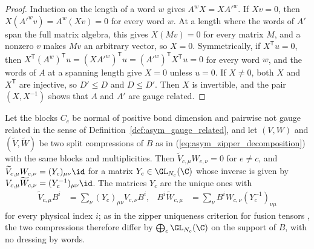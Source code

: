 \begin{proof}
    \leanok
    Induction on the length of a word $w$ gives $A^wX=XA'^w$. If $Xv=0$, then
    $X(A'^wv)=A^w(Xv)=0$ for every word $w$. At a length where the words of
    $A'$ span the full matrix algebra, this gives $X(Mv)=0$ for every matrix
    $M$, and a nonzero $v$ makes $Mv$ an arbitrary vector, so $X=0$.
    Symmetrically, if $X^{\mathsf T}u=0$, then
    $X^{\mathsf T}(A^w)^{\mathsf T}u=(XA'^w)^{\mathsf T}u
        =(A'^w)^{\mathsf T}X^{\mathsf T}u=0$ for every word $w$, and the words
    of $A$ at a spanning length give $X=0$ unless $u=0$. If $X\neq0$, both
    $X$ and $X^{\mathsf T}$ are injective, so $D'\leq D$ and $D\leq D'$. Then $X$ is
    invertible, and the pair $(X,X^{-1})$ shows that $A$ and $A'$ are
    gauge related.
\end{proof}

\begin{lemma}
    \label{thm:asym_zipper_uniqueness}
    \leanok
    Let the blocks $C_c$ be normal of positive bond dimension and pairwise
    not gauge related in the sense of Definition~\ref{def:asym_gauge_related},
    and let $(V,W)$ and
    $(\widetilde V,\widetilde W)$ be two split compressions of $B$ as in
    (\ref{eq:asym_zipper_decomposition}) with the same blocks and
    multiplicities. Then $\widetilde V_{c,\mu}W_{e,\nu}=0$ for $e\neq c$, and
    $\widetilde V_{c,\mu}W_{c,\nu}=(Y_c)_{\mu\nu}\id$ for a matrix
    $Y_c\in\GL_{N_c}(\C)$ whose inverse is given by
    $V_{c,\mu}\widetilde W_{c,\nu}=(Y_c^{-1})_{\mu\nu}\id$. The matrices $Y_c$
    are the unique ones with
    \begin{align}
        \widetilde V_{c,\mu}B^i & =\sum_\nu(Y_c)_{\mu\nu}V_{c,\nu}B^i,      &
        B^i\widetilde W_{c,\mu} & =\sum_\nu B^iW_{c,\nu}(Y_c^{-1})_{\nu\mu}
        \label{eq:asym_zipper_gauge}
    \end{align}
    for every physical index $i$; as in the zipper uniqueness criterion for
    fusion tensors \cite{Bultinck2017Anyons}, the two compressions therefore
    differ by $\bigoplus_c\GL_{N_c}(\C)$ on the support of $B$, with no
    dressing by words.
\end{lemma}

